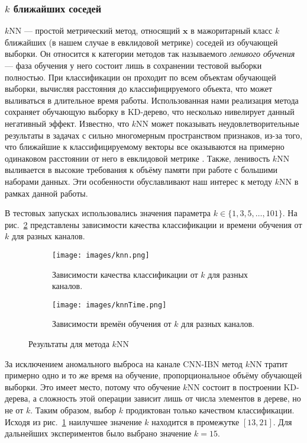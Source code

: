 \subsubsection{\(k\) ближайших соседей}
\(k\)NN --- простой метрический метод, относящий \(\mathbf{x}\) в мажоритарный класс \(k\) ближайших (в нашем случае в евклидовой метрике) соседей из обучающей выборки. Он относится к категории методов так называемого \emph{ленивого обучения} --- фаза обучения у него состоит лишь в сохранении тестовой выборки полностью. При классификации он проходит по всем объектам обучающей выборки, вычисляя расстояния до классифицируемого объекта, что может выливаться в длительное время работы. Использованная нами реализация метода сохраняет обучающую выборку в KD-дерево, что несколько нивелирует данный негативный эффект. Известно, что \(k\)NN может показывать неудовлетворительные результаты в задачах с сильно многомерным пространством признаков, из-за того, что ближайшие к классифицируемому векторы все оказываются на примерно одинаковом расстоянии от него в евклидовой метрике \cite{beyer}. Также, ленивость \(k\)NN выливается в высокие требования к объёму памяти при работе с большими наборами данных. Эти особенности обуславливают наш интерес к методу \(k\)NN в рамках данной работы.

В тестовых запусках использовались значения параметра \(k\in\{1,3,5,\dotsc,101\}\). На рис.~\ref{fig:knn-base} представлены зависимости качества классификации и времени обучения от \(k\) для разных каналов.
\begin{figure}[h!]
    \centering
	\begin{subfigure}{0.45\textwidth}
		\texttt{[image: images/knn.png]}
		\caption{Зависимости качества классификации от \(k\) для разных каналов.}\label{fig:knn-base-scores}
	\end{subfigure}
	\begin{subfigure}{0.45\textwidth}
		\texttt{[image: images/knnTime.png]}
		\caption{Зависимости времён обучения от \(k\) для разных каналов.}
	\end{subfigure}
	\caption{Результаты для метода \(k\)NN}\label{fig:knn-base}
\end{figure}

За исключением аномального выброса на канале CNN-IBN метод \(k\)NN тратит примерно одно и то же время на обучение, пропорциональное объёму обучающей выборки. Это имеет место, потому что обучение \(k\)NN состоит в построении KD-дерева, а сложность этой операции зависит лишь от числа элементов в дереве, но не от \(k\). Таким образом, выбор \(k\) продиктован только качеством классификации. Исходя из рис.~\ref{fig:knn-base-scores} наилучшее значение \(k\) находится в промежутке \([13,21]\). Для дальнейших экспериментов было выбрано значение \(k=15\).

